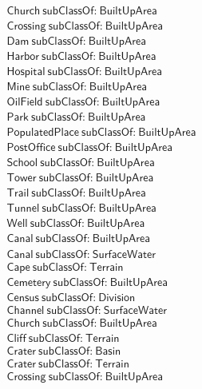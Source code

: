 \begin{align}
  \textsf{Church}~\textsf{subClassOf:}~\textsf{BuiltUpArea}\\
  \textsf{Crossing}~\textsf{subClassOf:}~\textsf{BuiltUpArea}\\
  \textsf{Dam}~\textsf{subClassOf:}~\textsf{BuiltUpArea}\\
  \textsf{Harbor}~\textsf{subClassOf:}~\textsf{BuiltUpArea}\\
  \textsf{Hospital}~\textsf{subClassOf:}~\textsf{BuiltUpArea}\\
  \textsf{Mine}~\textsf{subClassOf:}~\textsf{BuiltUpArea}\\
  \textsf{OilField}~\textsf{subClassOf:}~\textsf{BuiltUpArea}\\
  \textsf{Park}~\textsf{subClassOf:}~\textsf{BuiltUpArea}\\
  \textsf{PopulatedPlace}~\textsf{subClassOf:}~\textsf{BuiltUpArea}\\
  \textsf{PostOffice}~\textsf{subClassOf:}~\textsf{BuiltUpArea}\\
  \textsf{School}~\textsf{subClassOf:}~\textsf{BuiltUpArea}\\
  \textsf{Tower}~\textsf{subClassOf:}~\textsf{BuiltUpArea}\\
  \textsf{Trail}~\textsf{subClassOf:}~\textsf{BuiltUpArea}\\
  \textsf{Tunnel}~\textsf{subClassOf:}~\textsf{BuiltUpArea}\\
  \textsf{Well}~\textsf{subClassOf:}~\textsf{BuiltUpArea}\\
  \textsf{Canal}~\textsf{subClassOf:}~\textsf{BuiltUpArea}\\
  \textsf{Canal}~\textsf{subClassOf:}~\textsf{SurfaceWater}\\
  \textsf{Cape}~\textsf{subClassOf:}~\textsf{Terrain}\\
  \textsf{Cemetery}~\textsf{subClassOf:}~\textsf{BuiltUpArea}\\
  \textsf{Census}~\textsf{subClassOf:}~\textsf{Division}\\
  \textsf{Channel}~\textsf{subClassOf:}~\textsf{SurfaceWater}\\
  \textsf{Church}~\textsf{subClassOf:}~\textsf{BuiltUpArea}\\
  \textsf{Cliff}~\textsf{subClassOf:}~\textsf{Terrain}\\
  \textsf{Crater}~\textsf{subClassOf:}~\textsf{Basin}\\
  \textsf{Crater}~\textsf{subClassOf:}~\textsf{Terrain}\\
  \textsf{Crossing}~\textsf{subClassOf:}~\textsf{BuiltUpArea}\\

\end{align}
